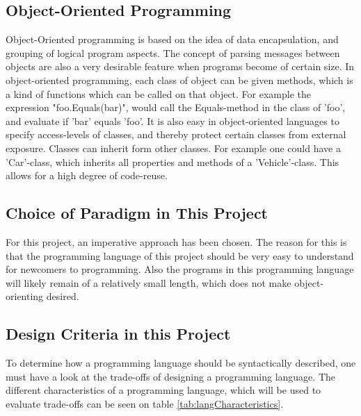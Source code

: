 \subsection{Object-Oriented Programming}
Object-Oriented programming is based on the idea of data encapsulation, and grouping of logical program aspects. The concept of parsing messages between objects are also a very desirable feature when programs become of certain size. In object-oriented programming, each class of object can be given methods, which is a kind of functions which can be called on that object. For example the expression "foo.Equals(bar)", would call the Equals-method in the class of 'foo', and evaluate if 'bar' equals 'foo'. It is also easy in object-oriented languages to specify access-levels of classes, and thereby protect certain classes from external exposure.  Classes can inherit form other classes. For example one could have a 'Car'-class, which inherits all properties and methods of a 'Vehicle'-class. This allows for a high degree of code-reuse.

\subsection{Choice of Paradigm in This Project}
For this project, an imperative approach has been chosen. The reason for this is that the programming language of this project should be very easy to understand for newcomers to programming. Also the programs in this programming language will likely remain of a relatively small length, which does not make object-orienting desired.

\subsection{Design Criteria in this Project}
To determine how a programming language should be syntactically described, one must have a look at the trade-offs of designing a programming language. The different characteristics of a programming language, which will be used to evaluate trade-offs can be seen on table \ref{tab:langCharacteristics}.

